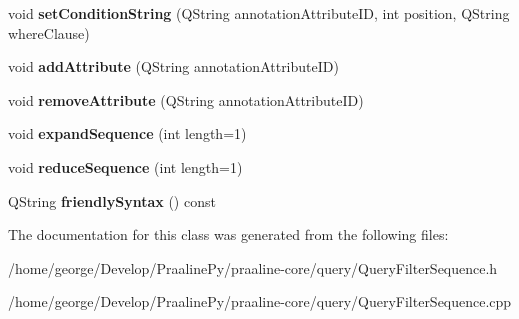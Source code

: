 \begin{DoxyCompactItemize}
void {\bfseries set\+Condition\+String} (Q\+String annotation\+Attribute\+ID, int position, Q\+String where\+Clause)
\item 
\mbox{\label{class_query_filter_sequence_a7c69ebb1409e84d584f0a2802fe2ea33}} 
void {\bfseries add\+Attribute} (Q\+String annotation\+Attribute\+ID)
\item 
\mbox{\label{class_query_filter_sequence_a4c8b1d81e3ce5fcc42c81e88eba3804c}} 
void {\bfseries remove\+Attribute} (Q\+String annotation\+Attribute\+ID)
\item 
\mbox{\label{class_query_filter_sequence_a5a58de4524250284c6ac3ea02ad9be71}} 
void {\bfseries expand\+Sequence} (int length=1)
\item 
\mbox{\label{class_query_filter_sequence_a2649254c871502ef8856d10492836e20}} 
void {\bfseries reduce\+Sequence} (int length=1)
\item 
\mbox{\label{class_query_filter_sequence_a199ce5306a626f10c9b69743b910dbbd}} 
Q\+String {\bfseries friendly\+Syntax} () const
\end{DoxyCompactItemize}


The documentation for this class was generated from the following files\+:\begin{DoxyCompactItemize}
\item 
/home/george/\+Develop/\+Praaline\+Py/praaline-\/core/query/Query\+Filter\+Sequence.\+h\item 
/home/george/\+Develop/\+Praaline\+Py/praaline-\/core/query/Query\+Filter\+Sequence.\+cpp\end{DoxyCompactItemize}
